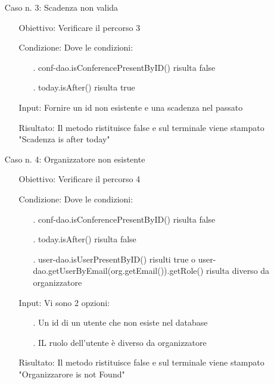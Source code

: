 \begin{itemize}
\begin{itemize}
\end{itemize}
\item[Caso n. 3:] Scadenza non valida
\begin{itemize}
\item[Obiettivo:]  Verificare il percorso 3
\item[Condizione:] Dove le condizioni:
\begin{itemize}
\item[.] conf-dao.isConferencePresentByID() risulta false
\item[.] today.isAfter() risulta true
\end{itemize}
\item[Input:] Fornire un id non esistente e una scadenza nel passato
\item[Risultato:] Il metodo ristituisce false e sul terminale viene stampato "Scadenza is after today"
\end{itemize}
\item[Caso n. 4:]  Organizzatore non esistente
\begin{itemize}
\item[Obiettivo:]   Verificare il percorso 4
\item[Condizione:]  Dove le condizioni:
\begin{itemize}
\item[.] conf-dao.isConferencePresentByID() risulta false
\item[.] today.isAfter() risulta false
\item[.] user-dao.isUserPresentByID() risulti true o user-dao.getUserByEmail(org.getEmail()).getRole() risulta diverso da organizzatore
\end{itemize}
\item[Input:] Vi sono 2 opzioni:
\begin{itemize}
\item[.] Un id di un utente che non esiste nel database
\item[.] IL ruolo dell'utente è diverso da organizzatore
\end{itemize}
\item[Risultato:] Il metodo ristituisce false e sul terminale viene stampato "Organizzarore is not Found"
\end{itemize}
\end{itemize}

